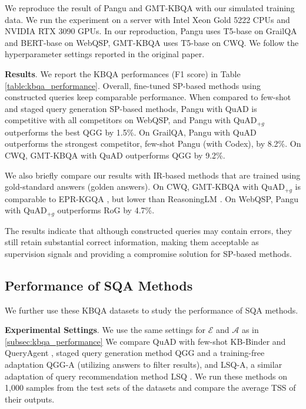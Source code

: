 \documentclass[runningheads]{llncs}
\begin{document}
We reproduce the result of Pangu \cite{gu2023pangu} and GMT-KBQA \cite{hu2022gmt} with our simulated training data. We run the experiment on a server with Intel Xeon Gold 5222 CPUs and NVIDIA RTX 3090 GPUs.
In our reproduction, Pangu uses T5-base \cite{raffel2020t5} on GrailQA and BERT-base \cite{delvin2019bert} on WebQSP, GMT-KBQA uses T5-base on CWQ. We follow the hyperparameter settings reported in the original paper.

\noindent \textbf{Results}. 
We report the KBQA performances (F1 score) in Table \ref{table:kbqa_performance}.
Overall, fine-tuned SP-based methods using constructed queries keep comparable performance.
When compared to few-shot and staged query generation SP-based methods, Pangu with QuAD is competitive with all competitors on WebQSP, and Pangu with QuAD$_{+g}$ outperforms the best QGG by 1.5\%.
On GrailQA,  Pangu with QuAD outperforms the strongest competitor, few-shot Pangu (with Codex), by 8.2\%.
On CWQ, GMT-KBQA with QuAD outperforms QGG by 9.2\%.

We also briefly compare our results with IR-based methods that are trained using gold-standard answers (golden answers).
On CWQ, GMT-KBQA with QuAD$_{+g}$ is comparable to EPR-KGQA \cite{ding2024epr}, but lower than ReasoningLM \cite{jiang2023reasoningLM}. 
On WebQSP, Pangu with QuAD$_{+g}$ outperforms RoG \cite{luo2023reasoning} by 4.7\%.

The results indicate that although constructed queries may contain errors, they still retain substantial correct information, making them acceptable as supervision signals and providing a compromise solution for SP-based methods. 



\subsection{Performance of SQA Methods} \label{subsec:exp_anno_kbqa}

We further use these KBQA datasets to study the performance of SQA methods.

\noindent \textbf{Experimental Settings}.
We use the same settings for $\mathcal{E}$ and $\mathcal{A}$ as in \ref{subsec:kbqa_performance}
We compare QuAD with few-shot KB-Binder \cite{li2023binder} and QueryAgent \cite{huang2024queryagent}, staged query generation method QGG \cite{lan2020qgg} and a training-free adaptation QGG-A (utilizing answers to filter results), and LSQ-A, a similar adaptation of query recommendation method LSQ \cite{potoniec2019lsq}. We run these methods on 1,000 samples from the test sets of the datasets and compare the average TSS of their outputs.
\end{document}
